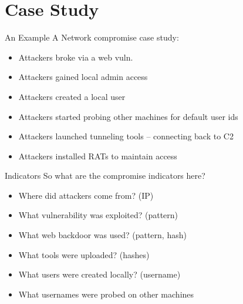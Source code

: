 \documentclass[presentation,smaller]{beamer}
\begin{document}
\section{Case Study}
\label{sec-6}
\begin{frame}[label=sec-6-1]{An Example}
A Network compromise case study:
\begin{itemize}
\item Attackers broke via a web vuln.
\item Attackers gained local admin access
\item Attackers created a local user
\item Attackers started probing other machines for default user ids
\item Attackers launched tunneling tools – connecting back to C2
\item Attackers installed RATs to maintain access
\end{itemize}
\end{frame}
\begin{frame}[label=sec-6-2]{Indicators}
So what are the compromise indicators here?

\begin{itemize}
\item Where did attackers come from? (IP)
\item What vulnerability was exploited? (pattern)
\item What web backdoor was used? (pattern, hash)
\item What tools were uploaded? (hashes)
\item What users were created locally? (username)
\item What usernames were probed on other machines
\end{itemize}
\end{frame}
\end{document}
